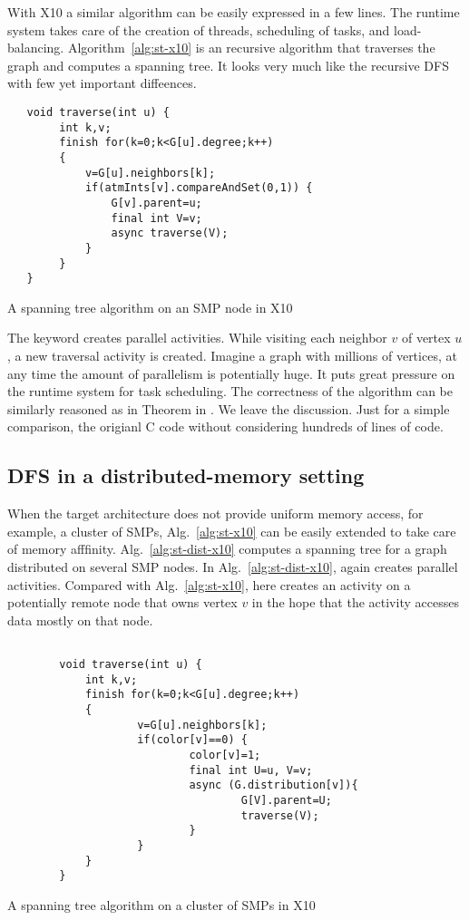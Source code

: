 \documentclass{llncs}
\begin{document}
With X10 a similar algorithm can be easily expressed in a few lines. The runtime system takes care of the creation of threads, scheduling of tasks, and load-balancing.  Algorithm~\ref{alg:st-x10} is an recursive algorithm that traverses the graph and computes a spanning tree. It looks very much like the recursive DFS with few yet important diffeences.

\begin{algorithm}
\begin{verbatim} 
   void traverse(int u) {
        int k,v;
        finish for(k=0;k<G[u].degree;k++)
        {
            v=G[u].neighbors[k];
            if(atmInts[v].compareAndSet(0,1)) {
                G[v].parent=u;
                final int V=v;
                async traverse(V);
            }
        }
   }
\end{verbatim}
\caption{A spanning tree algorithm on an SMP node in X10}
\label{alg:st-x10}
\end{algorithm}
The \async keyword creates parallel activities. While visiting each neighbor $v$ of vertex $u$, a new traversal activity is created. Imagine a graph with millions of vertices, at any time the amount of parallelism is potentially huge. It puts great pressure on the runtime system for task scheduling.  The correctness of the algorithm can be similarly reasoned as in Theorem in \cite{BC04}.  We leave the discussion. Just for a simple comparison, the origianl C code without considering 
hundreds of lines of code. 

\subsection{DFS in a distributed-memory setting}
\label{s:trav-dist}

 When the target architecture does not provide uniform memory access, for example, a cluster of SMPs, Alg.~\ref{alg:st-x10} can be easily extended to take care of memory afffinity. Alg.~\ref{alg:st-dist-x10} computes a spanning tree for a graph distributed on several SMP nodes. In Alg.~\ref{alg:st-dist-x10}, again \async creates parallel activities. Compared with Alg.~\ref{alg:st-x10}, here \async creates an activity on a potentially remote node that owns vertex $v$ in the hope that the activity accesses data mostly on that node. 
 
\begin{algorithm}
\begin{verbatim} 

        void traverse(int u) {
            int k,v;
            finish for(k=0;k<G[u].degree;k++)
            {
                    v=G[u].neighbors[k];
                    if(color[v]==0) {
                            color[v]=1;
                            final int U=u, V=v;
                            async (G.distribution[v]){
                                    G[V].parent=U;
                                    traverse(V);
                            }
                    }
            }
        }

\end{verbatim}
\caption{A spanning tree algorithm on a cluster of SMPs in X10}
\label{alg:st-dist-x10}
\end{algorithm}
\end{document}
